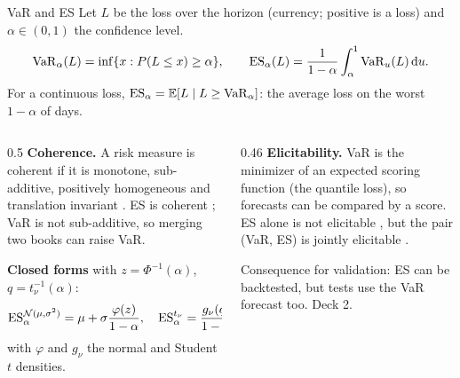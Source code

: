 \documentclass[aspectratio=169,10pt]{beamer}
\begin{document}
\begin{frame}{VaR and ES}
  \small
  Let $L$ be the loss over the horizon (currency; positive is a loss) and $\alpha \in (0,1)$ the confidence level.
  \[ \mathrm{VaR}_\alpha(L) = \inf\{x : P(L \le x) \ge \alpha\}, \qquad \mathrm{ES}_\alpha(L) = \frac{1}{1-\alpha}\int_\alpha^1 \mathrm{VaR}_u(L)\,\mathrm{d} u . \]
  For a continuous loss, $\mathrm{ES}_\alpha = \mathbb{E}[L \mid L \ge \mathrm{VaR}_\alpha]$: the average loss on the worst $1-\alpha$ of days.
  \vspace{0.3em}
  \begin{columns}[T]
    \begin{column}{0.5\textwidth}
      \textbf{Coherence.} A risk measure is coherent if it is monotone, sub-additive, positively homogeneous and translation invariant \citep{artzner1999coherent}. ES is coherent \citep{acerbi2002coherence}; VaR is not sub-additive, so merging two books can raise VaR.
      \vspace{0.3em}

      \textbf{Closed forms} with $z = \Phi^{-1}(\alpha)$, $q = t_\nu^{-1}(\alpha)$:
      \[ \mathrm{ES}^{\mathcal N(\mu,\sigma^2)}_\alpha = \mu + \sigma\frac{\varphi(z)}{1-\alpha}, \quad \mathrm{ES}^{t_\nu}_\alpha = \frac{g_\nu(q)}{1-\alpha}\,\frac{\nu+q^2}{\nu-1}, \]
      with $\varphi$ and $g_\nu$ the normal and Student $t$ densities.
    \end{column}
    \begin{column}{0.46\textwidth}
      \textbf{Elicitability.} VaR is the minimizer of an expected scoring function (the quantile loss), so forecasts can be compared by a score. ES alone is not elicitable \citep{gneiting2011making}, but the pair (VaR, ES) is jointly elicitable \citep{fissler2016higher}.
      \vspace{0.3em}

      Consequence for validation: ES can be backtested, but tests use the VaR forecast too. Deck 2.
    \end{column}
  \end{columns}
\end{frame}
\end{document}
